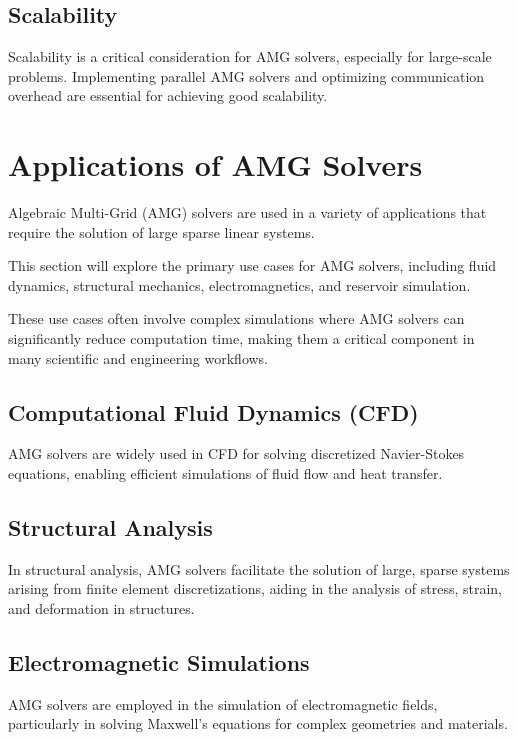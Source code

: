 \subsection{Scalability}

Scalability is a critical consideration for AMG solvers, especially for large-scale problems. Implementing parallel AMG solvers and optimizing communication overhead are essential for achieving good scalability.

\section{Applications of AMG Solvers}

Algebraic Multi-Grid (AMG) solvers are used in a variety of applications that require the solution of large sparse linear systems. 

This section will explore the primary use cases for AMG solvers, including fluid dynamics, structural mechanics, electromagnetics, and reservoir simulation. 

These use cases often involve complex simulations where AMG solvers can significantly reduce computation time, making them a critical component in many scientific and engineering workflows.

\subsection{Computational Fluid Dynamics (CFD)}

AMG solvers are widely used in CFD for solving discretized Navier-Stokes equations, enabling efficient simulations of fluid flow and heat transfer.

\subsection{Structural Analysis}

In structural analysis, AMG solvers facilitate the solution of large, sparse systems arising from finite element discretizations, aiding in the analysis of stress, strain, and deformation in structures.

\subsection{Electromagnetic Simulations}

AMG solvers are employed in the simulation of electromagnetic fields, particularly in solving Maxwell's equations for complex geometries and materials.

